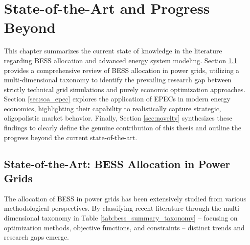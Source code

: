 \chapter{State-of-the-Art and Progress Beyond} \label{ch:state_of_the_art}

This chapter summarizes the current state of knowledge in the literature regarding BESS allocation and advanced energy system modeling. Section \ref{sec:soa_bess} provides a comprehensive review of BESS allocation in power grids, utilizing a multi-dimensional taxonomy to identify the prevailing research gap between strictly technical grid simulations and purely economic optimization approaches. Section \ref{sec:soa_epec} explores the application of EPECs in modern energy economics, highlighting their capability to realistically capture strategic, oligopolistic market behavior. Finally, Section \ref{sec:novelty} synthesizes these findings to clearly define the genuine contribution of this thesis and outline the progress beyond the current state-of-the-art.

\section{State-of-the-Art: BESS Allocation in Power Grids} \label{sec:soa_bess}
The allocation of BESS in power grids has been extensively studied from various methodological perspectives. By classifying recent literature through the multi-dimensional taxonomy in Table \ref{tab:bess_summary_taxonomy} -- focusing on optimization methods, objective functions, and constraints -- distinct trends and research gaps emerge. 

